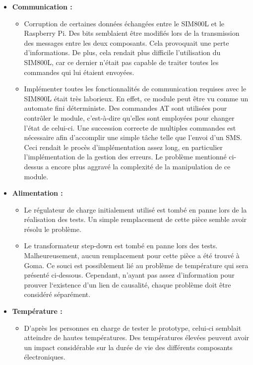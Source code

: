 \begin{itemize}
  \item \textbf{Communication :}
  \begin{itemize}
    \item Corruption de certaines données échangées entre le SIM800L et le Raspberry Pi. Des bits semblaient être modifiés lors de la transmission des messages entre les deux composants. Cela provoquait une perte d’informations. De plus, cela rendait plus difficile l'utilisation du SIM800L, car ce dernier n’était pas capable de traiter toutes les commandes qui lui étaient envoyées.

    \item Implémenter toutes les fonctionnalités de communication requises avec le SIM800L était très laborieux. En effet, ce module peut être vu comme un automate fini déterministe. Des commandes AT sont utilisées pour contrôler le module, c’est-à-dire qu'elles sont employées pour changer l’état de celui-ci. Une succession correcte de multiples commandes est nécessaire afin d'accomplir une simple tâche telle que l'envoi d'un SMS. Ceci rendait le procès d’implémentation assez long, en particulier l’implémentation de la gestion des erreurs. Le problème mentionné ci-dessus a encore plus aggravé la complexité de la manipulation de ce module.
  \end{itemize}

  \item \textbf{Alimentation :}
  \begin{itemize}
    \item Le régulateur de charge initialement utilisé est tombé en panne lors de la réalisation des tests. Un simple remplacement de cette pièce semble avoir résolu le problème.

    \item Le transformateur step-down est tombé en panne lors des tests. Malheureusement, aucun remplacement pour cette pièce a été trouvé à Goma. Ce souci est possiblement lié au problème de température qui sera présenté ci-dessous. Cependant, n’ayant pas assez d’information pour prouver l‘existence d'un lien de causalité, chaque problème doit être considéré séparément.
  \end{itemize}

  \item \textbf{Température :}
  \begin{itemize}
    \item D’après les personnes en charge de tester le prototype, celui-ci semblait atteindre de hautes températures. Des températures élevées peuvent avoir un impact considérable sur la durée de vie des différents composants électroniques.
  \end{itemize}
\end{itemize}

